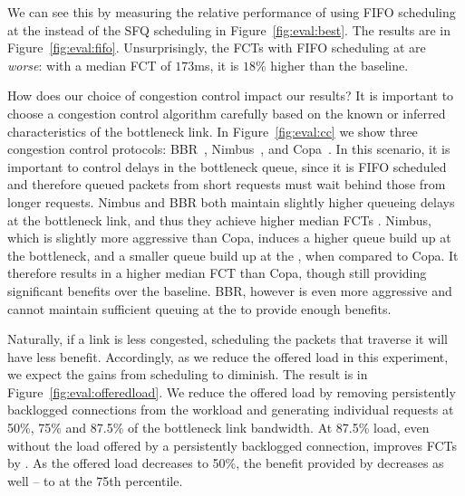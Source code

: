 

We can see this by measuring the relative performance of using FIFO scheduling at the \name instead of the SFQ scheduling in Figure~\ref{fig:eval:best}.
The results are in Figure~\ref{fig:eval:fifo}. 
Unsurprisingly, the FCTs with FIFO scheduling at \name are \emph{worse}: with a median FCT of $173$ms, it is $18$\% higher than the baseline. 




 How does our choice of congestion control impact our results? 
It is important to choose a congestion control algorithm carefully based on the known or inferred characteristics of the bottleneck link. 
In Figure~\ref{fig:eval:cc} we show three congestion control protocols: BBR~\cite{bbr}, Nimbus~\cite{nimbus}, and Copa~\cite{copa}.
In this scenario, it is important to control delays in the bottleneck queue, since it is FIFO scheduled and therefore queued packets from short requests must wait behind those from longer requests. Nimbus and BBR both maintain slightly higher queueing delays at the bottleneck link, and thus they achieve higher median FCTs . 
Nimbus, which is slightly more aggressive than Copa, induces a higher queue build up at the bottleneck, and a smaller queue build up at the \name, when compared to Copa. It therefore results in a higher median FCT than Copa, though still providing significant benefits over the baseline. BBR, however is even more aggressive and cannot maintain sufficient queuing at the \name to provide enough benefits.






 Naturally, if a link is less congested, scheduling the packets that traverse it will have less benefit. Accordingly, as we reduce the offered load in this experiment, we expect the gains from scheduling to diminish. The result is in Figure~\ref{fig:eval:offeredload}. We reduce the offered load by removing persistently backlogged connections from the workload and generating individual requests at 50\%, 75\% and 87.5\% of the bottleneck link bandwidth. 
At 87.5\% load, even without the load offered by a persistently backlogged connection, \name improves FCTs by . 
As the offered load decreases to 50\%, the benefit provided by \name decreases as well -- to  at the 75th percentile.

